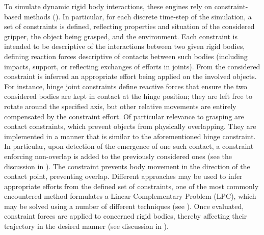 To simulate dynamic rigid body interactions, these engines rely on constraint-based methods (\cite{baraff1993non}). In particular, for each discrete time-step of the simulation, a set of constraints is defined, reflecting properties and situation of the considered gripper, the object being grasped, and the environment. Each constraint is intended to be descriptive of the interactions between two given rigid bodies, defining reaction forces descriptive of contacts between such bodies (including impacts, support, or reflecting exchanges of efforts in joints). From the considered constraint is inferred an appropriate effort being applied on the involved objects. For instance, hinge joint constraints define reactive forces that ensure the two considered bodies are kept in contact at the hinge position; they are left free to rotate around the specified axis, but other relative movements are entirely compensated by the constraint effort. Of particular relevance to grasping are contact constraints, which prevent objects from physically overlapping. They are implemented in a manner that is similar to the aforementioned hinge constraint. In particular, upon detection of the emergence of one such contact, a constraint enforcing non-overlap is added to the previously considered ones (see the discussion in \cite{baraff1993non}). The constraint prevents body movement in the direction of the contact point, preventing overlap. Different approaches may be used to infer appropriate efforts from the defined set of constraints, one of the most commonly encountered method formulates a Linear Complementary Problem (LPC), which may be solved using a number of different techniques (see \cite{anitescu_time_stepping_lcp_solver,lemke_lcp_solver}). Once evaluated, constraint forces are applied to concerned rigid bodies, thereby affecting their trajectory in the desired manner (see discussion in \cite{extending_ode_robots}).

